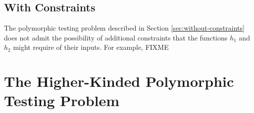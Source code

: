 \documentclass{llncs}
\newcommand{\fold}[1]{\llparenthesis #1 \rrparenthesis} %
\newcommand{\eqAnnotation}[1]{\hspace{2cm}\left\{\textrm{#1}\right\}}
\begin{document}


\subsection{With Constraints}

The polymorphic testing problem described in Section
\ref{sec:without-constraints} does not admit the possibility of
additional constraints that the functions $h_1$ and $h_2$ might
require of their inputs. For example, FIXME

\section{The Higher-Kinded Polymorphic Testing Problem}
\end{document}
